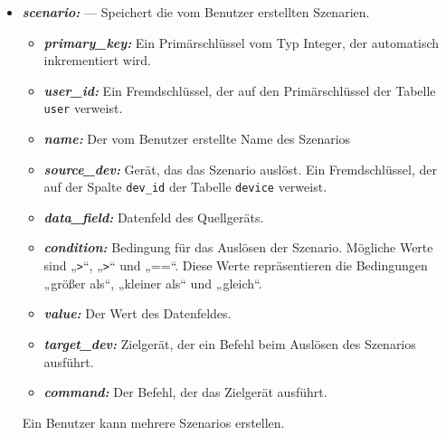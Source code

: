 \documentclass[12pt, letterpaper]{article}
\begin{document}
\begin{itemize}
                        \begin{itemize}
                          \item \textit{\textbf{primary\_key:}} Ein Primärschlüssel vom Typ Integer, der automatisch inkrementiert wird.
                          \item \textit{\textbf{room\_id:}} Ein Fremdschlüssel, der auf den Primärschlüssel der Tabelle \texttt{room} verweist.
                          \item \textit{\textbf{device\_primary:}} Ein Fremdschlüssel, der auf den Primärschlüssel der Tabelle device verweist.
                        \end{itemize}
    \item \textit{\textbf{scenario:}} --- Speichert die vom Benutzer erstellten Szenarien.
                        \begin{itemize}
                          \item \textit{\textbf{primary\_key:}} Ein Primärschlüssel vom Typ Integer, der automatisch inkrementiert wird.
                          \item \textit{\textbf{user\_id:}} Ein Fremdschlüssel, der auf den Primärschlüssel der Tabelle \texttt{user} verweist.
                          \item \textit{\textbf{name:}} Der vom Benutzer erstellte Name des Szenarios
                          \item \textit{\textbf{source\_dev:}} Gerät, das das Szenario auslöst. Ein Fremdschlüssel, der auf der Spalte \texttt{dev\_id} der Tabelle \texttt{device} verweist.
                          \item \textit{\textbf{data\_field:}} Datenfeld des Quellgeräts.
                          \item \textit{\textbf{condition:}} Bedingung für das Auslösen der Szenario. Mögliche Werte sind „\texttt{>}“, „\texttt{>}“  und „==“. Diese Werte repräsentieren die Bedingungen „größer als“, „kleiner als“ und „gleich“.
                          \item \textit{\textbf{value:}} Der Wert des Datenfeldes. 
                          \item \textit{\textbf{target\_dev:}} Zielgerät, der ein Befehl beim Auslösen des Szenarios ausführt.
                          \item \textit{\textbf{command:}} Der Befehl, der das Zielgerät ausführt.
                        \end{itemize}
                        Ein Benutzer kann mehrere Szenarios erstellen. 
  \end{itemize}
\end{document}
